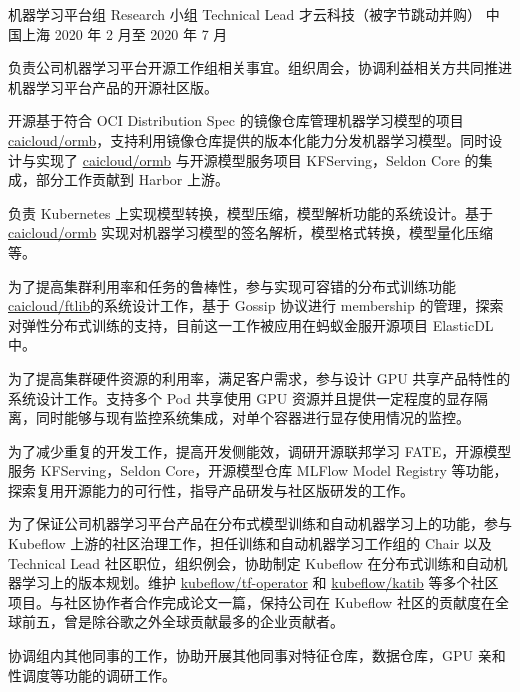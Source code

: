 \begin{cventries}
  \cventry
    {机器学习平台组 Research 小组 Technical Lead} %
    {才云科技（被字节跳动并购）} %
    {中国上海} %
    {2020 年 2 月至 2020 年 7 月} %
    {
      \begin{cvitems} %
        \item 负责公司机器学习平台开源工作组相关事宜。组织周会，协调利益相关方共同推进机器学习平台产品的开源社区版。
        \item 开源基于符合 OCI Distribution Spec 的镜像仓库管理机器学习模型的项目 \href{https://github.com/caicloud/ormb}{caicloud/ormb}，支持利用镜像仓库提供的版本化能力分发机器学习模型。同时设计与实现了 \href{https://github.com/caicloud/ormb}{caicloud/ormb} 与开源模型服务项目 KFServing，Seldon Core 的集成，部分工作贡献到 Harbor 上游。
        \item 负责 Kubernetes 上实现模型转换，模型压缩，模型解析功能的系统设计。基于 \href{https://github.com/caicloud/ormb}{caicloud/ormb} 实现对机器学习模型的签名解析，模型格式转换，模型量化压缩等。
        \item 为了提高集群利用率和任务的鲁棒性，参与实现可容错的分布式训练功能 \href{https://github.com/caicloud/ftlib}{caicloud/ftlib}的系统设计工作，基于 Gossip 协议进行 membership 的管理，探索对弹性分布式训练的支持，目前这一工作被应用在蚂蚁金服开源项目 ElasticDL 中。
        \item 为了提高集群硬件资源的利用率，满足客户需求，参与设计 GPU 共享产品特性的系统设计工作。支持多个 Pod 共享使用 GPU 资源并且提供一定程度的显存隔离，同时能够与现有监控系统集成，对单个容器进行显存使用情况的监控。
        \item 为了减少重复的开发工作，提高开发侧能效，调研开源联邦学习 FATE，开源模型服务 KFServing，Seldon Core，开源模型仓库 MLFlow Model Registry 等功能，探索复用开源能力的可行性，指导产品研发与社区版研发的工作。
        \item 为了保证公司机器学习平台产品在分布式模型训练和自动机器学习上的功能，参与 Kubeflow 上游的社区治理工作，担任训练和自动机器学习工作组的 Chair 以及 Technical Lead 社区职位，组织例会，协助制定 Kubeflow 在分布式训练和自动机器学习上的版本规划。维护 \href{https://github.com/kubeflow/tf-operator}{kubeflow/tf-operator} 和 \href{https://github.com/kubeflow/katib}{kubeflow/katib} 等多个社区项目。与社区协作者合作完成论文一篇，保持公司在 Kubeflow 社区的贡献度在全球前五，曾是除谷歌之外全球贡献最多的企业贡献者。
        \item 协调组内其他同事的工作，协助开展其他同事对特征仓库，数据仓库，GPU 亲和性调度等功能的调研工作。
      \end{cvitems}
    }


\end{cventries}
